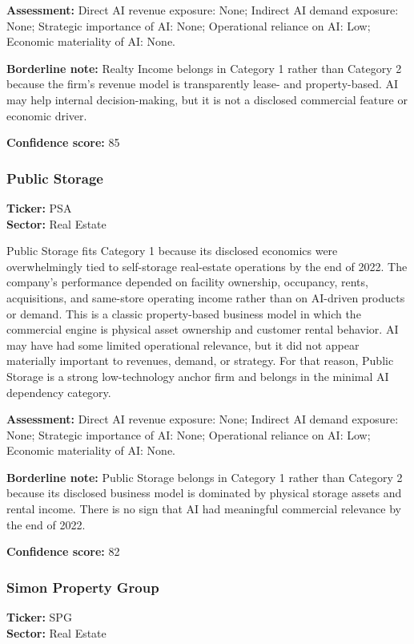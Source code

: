 \documentclass{article}
\begin{document}
\textbf{Assessment:} Direct AI revenue exposure: None; Indirect AI demand exposure: None; Strategic importance of AI: None; Operational reliance on AI: Low; Economic materiality of AI: None.

\textbf{Borderline note:} Realty Income belongs in Category 1 rather than Category 2 because the firm’s revenue model is transparently lease- and property-based. AI may help internal decision-making, but it is not a disclosed commercial feature or economic driver.

\textbf{Confidence score:} 85

\subsubsection*{Public Storage}
\textbf{Ticker:} PSA \\
\textbf{Sector:} Real Estate

Public Storage fits Category 1 because its disclosed economics were overwhelmingly tied to self-storage real-estate operations by the end of 2022. The company’s performance depended on facility ownership, occupancy, rents, acquisitions, and same-store operating income rather than on AI-driven products or demand. This is a classic property-based business model in which the commercial engine is physical asset ownership and customer rental behavior. AI may have had some limited operational relevance, but it did not appear materially important to revenues, demand, or strategy. For that reason, Public Storage is a strong low-technology anchor firm and belongs in the minimal AI dependency category.

\textbf{Assessment:} Direct AI revenue exposure: None; Indirect AI demand exposure: None; Strategic importance of AI: None; Operational reliance on AI: Low; Economic materiality of AI: None.

\textbf{Borderline note:} Public Storage belongs in Category 1 rather than Category 2 because its disclosed business model is dominated by physical storage assets and rental income. There is no sign that AI had meaningful commercial relevance by the end of 2022.

\textbf{Confidence score:} 82

\subsubsection*{Simon Property Group}
\textbf{Ticker:} SPG \\
\textbf{Sector:} Real Estate
\end{document}
